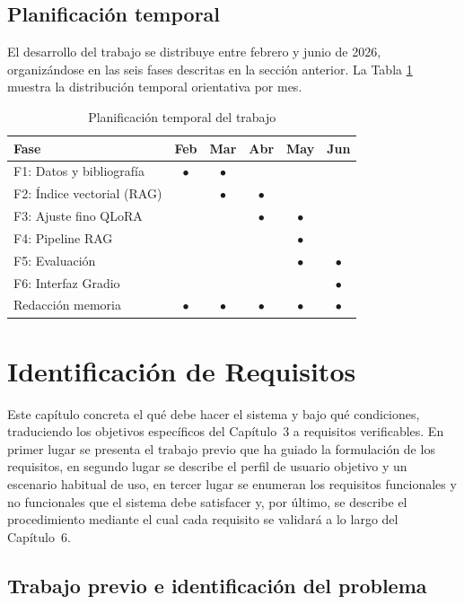 \documentclass[11pt,a4paper,spanish]{book}
\numberwithin{equation}{chapter}
\numberwithin{figure}{chapter}
\begin{document}
\section{Planificación temporal}

El desarrollo del trabajo se distribuye entre febrero y junio de 2026, organizándose en las seis fases descritas en la sección anterior. La Tabla \ref{tab:gantt} muestra la distribución temporal orientativa por mes.

\begin{table}[h]
\centering
\begin{tabular}{|l|c|c|c|c|c|}
\hline
\textbf{Fase} & \textbf{Feb} & \textbf{Mar} & \textbf{Abr} & \textbf{May} & \textbf{Jun} \\
\hline
F1: Datos y bibliografía & $\bullet$ & $\bullet$ & & & \\
F2: Índice vectorial (RAG) & & $\bullet$ & $\bullet$ & & \\
F3: Ajuste fino QLoRA & & & $\bullet$ & $\bullet$ & \\
F4: Pipeline RAG & & & & $\bullet$ & \\
F5: Evaluación & & & & $\bullet$ & $\bullet$ \\
F6: Interfaz Gradio & & & & & $\bullet$ \\
Redacción memoria & $\bullet$ & $\bullet$ & $\bullet$ & $\bullet$ & $\bullet$ \\
\hline
\end{tabular}
\caption{Planificación temporal del trabajo}
\label{tab:gantt}
\end{table}

\chapter{Identificación de Requisitos}

Este capítulo concreta el qué debe hacer el sistema y bajo qué condiciones, traduciendo los objetivos específicos del Capítulo~3 a requisitos verificables. En primer lugar se presenta el trabajo previo que ha guiado la formulación de los requisitos, en segundo lugar se describe el perfil de usuario objetivo y un escenario habitual de uso, en tercer lugar se enumeran los requisitos funcionales y no funcionales que el sistema debe satisfacer y, por último, se describe el procedimiento mediante el cual cada requisito se validará a lo largo del Capítulo~6.

\section{Trabajo previo e identificación del problema}
\end{document}
